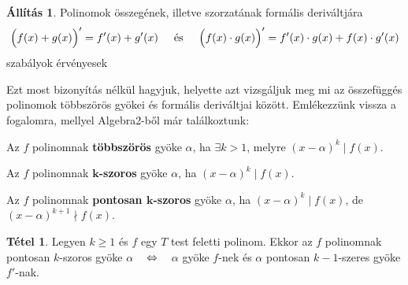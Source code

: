 \documentclass[12pt]{book}
\theoremstyle{plain} %
\theoremstyle{definition} %
\newtheorem{all/}{Állítás}[section]
\newenvironment{all}
{\renewcommand{\qedsymbol}{$\clubsuit$}%
	\pushQED{\qed}\begin{all/}}
	{\popQED\end{all/}}
\newtheorem{theo/}{Tétel}[section]
\newenvironment{theo}
  {\renewcommand{\qedsymbol}{$\clubsuit$}%
   \pushQED{\qed}\begin{theo/}}
  {\popQED\end{theo/}}
\theoremstyle{remark}
\renewcommand\qedsymbol{$\blacksquare$}
\numberwithin{equation}{section}  %
\begin{document}
	\begin{all}
		Polinomok összegének, illetve szorzatának formális deriváltjára
		\[ \Big(f(x)+g(x)\Big)' = f'(x) + g'(x) \hspace{5mm} \text{és} \hspace{5mm} \Big(f(x)\cdot g(x)\Big)' = f'(x)\cdot g(x) + f(x) \cdot g'(x)  \]
		szabályok érvényesek
	\end{all}
	
	Ezt most bizonyítás nélkül hagyjuk, helyette azt vizsgáljuk meg mi az összefüggés polinomok többszörös gyökei és formális deriváltjai között. Emlékezzünk vissza a fogalomra, mellyel Algebra2-ből már találkoztunk:
	
	Az $f$ polinomnak \textbf{többszörös} gyöke $\alpha$, ha $\exists k>1$, melyre $(x-\alpha)^k \mid f(x)$.

	Az $f$ polinomnak \textbf{$\mathbf{k}$-szoros} gyöke $\alpha$, ha $(x-\alpha)^k \mid f(x)$.

	Az $f$ polinomnak \textbf{pontosan $\mathbf{k}$-szoros} gyöke $\alpha$, ha $(x-\alpha)^k \mid f(x)$, de $(x-\alpha)^{k+1}\nmid f(x)$.
	
	\begin{theo}\label{deriv}
		Legyen $k\geq 1$ és $f$ egy $T$ test feletti polinom. Ekkor az $f$ polinomnak pontosan $k$-szoros gyöke $\alpha$ $\hspace{3mm} \Leftrightarrow \hspace{3mm}$ $\alpha$ gyöke $f$-nek és $\alpha$ pontosan $k-1$-szeres gyöke $f'$-nak.
	\end{theo}
\end{document}
